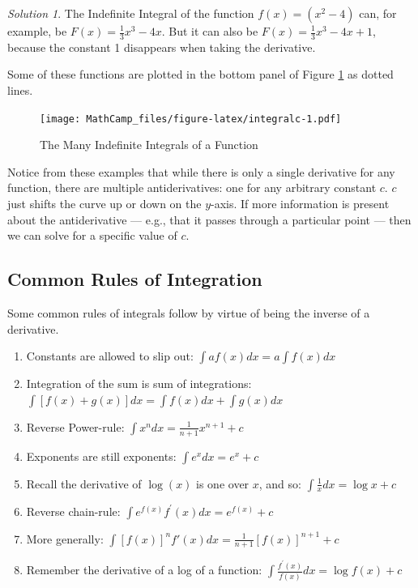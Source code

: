 \documentclass[
]{book}
\providecommand{\tightlist}{%
  \setlength{\itemsep}{0pt}\setlength{\parskip}{0pt}}
\theoremstyle{definition}
\theoremstyle{definition}
\theoremstyle{definition}
\theoremstyle{definition}
\theoremstyle{remark}
\newtheorem*{solution}{Solution}
\begin{document}
\begin{solution}
{}The Indefinite Integral of the function \(f(x) = (x^2-4)\) can, for example, be \(F(x) = \frac{1}{3}x^3 - 4x.\) But it can also be \(F(x) = \frac{1}{3}x^3 - 4x + 1\), because the constant 1 disappears when taking the derivative.
\end{solution}

Some of these functions are plotted in the bottom panel of Figure \ref{fig:integralc} as dotted lines.

\begin{figure}
\centering
\texttt{[image: MathCamp\_files/figure-latex/integralc-1.pdf]}
\caption{\label{fig:integralc}The Many Indefinite Integrals of a Function}
\end{figure}

Notice from these examples that while there is only a single derivative for any function, there are multiple antiderivatives: one for any arbitrary constant \(c\). \(c\) just shifts the curve up or down on the \(y\)-axis. If more information is present about the antiderivative --- e.g., that it passes through a particular point --- then we can solve for a specific value of \(c\).

\hypertarget{common-rules-of-integration}{%
\subsection*{Common Rules of Integration}\label{common-rules-of-integration}}

Some common rules of integrals follow by virtue of being the inverse of a derivative.

\begin{enumerate}
\def\labelenumi{\arabic{enumi}.}
\tightlist
\item
  Constants are allowed to slip out: \(\int a f(x)dx = a\int f(x)dx\)
\item
  Integration of the sum is sum of integrations: \(\int [f(x)+g(x)]dx=\int f(x)dx + \int g(x)dx\)
\item
  Reverse Power-rule: \(\int x^n dx = \frac{1}{n+1} x^{n+1} + c\)
\item
  Exponents are still exponents: \(\int e^x dx = e^x +c\)
\item
  Recall the derivative of \(\log(x)\) is one over \(x\), and so: \(\int \frac{1}{x} dx = \log x + c\)
\item
  Reverse chain-rule: \(\int e^{f(x)}f^\prime(x)dx = e^{f(x)}+c\)
\item
  More generally: \(\int [f(x)]^n f'(x)dx = \frac{1}{n+1}[f(x)]^{n+1}+c\)
\item
  Remember the derivative of a log of a function: \(\int \frac{f^\prime(x)}{f(x)}dx=\log f(x) + c\)
\end{enumerate}
\end{document}
